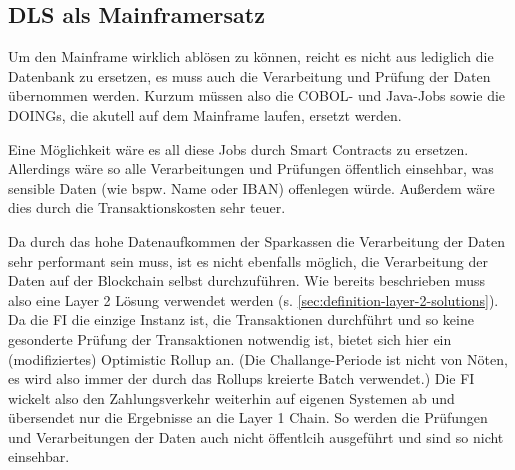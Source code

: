 

\subsection{DLS als Mainframersatz}
Um den Mainframe wirklich ablösen zu können, reicht es nicht aus lediglich die Datenbank zu ersetzen, es muss auch die Verarbeitung und Prüfung der Daten übernommen werden.
Kurzum müssen also die COBOL- und Java-Jobs sowie die DOINGs, die akutell auf dem Mainframe laufen, ersetzt werden.

\noindent
Eine Möglichkeit wäre es all diese Jobs durch Smart Contracts zu ersetzen.
Allerdings wäre so alle Verarbeitungen und Prüfungen öffentlich einsehbar, was sensible Daten (wie bspw. Name oder IBAN) offenlegen würde.
Außerdem wäre dies durch die Transaktionskosten sehr teuer.

\noindent
Da durch das hohe Datenaufkommen der Sparkassen die Verarbeitung der Daten sehr performant sein muss, ist es nicht ebenfalls möglich, die Verarbeitung der Daten auf der Blockchain selbst durchzuführen.
Wie bereits beschrieben muss also eine Layer 2 Lösung verwendet werden (s. \ref{sec:definition-layer-2-solutions}).
Da die FI die einzige Instanz ist, die Transaktionen durchführt und so keine gesonderte Prüfung der Transaktionen notwendig ist, bietet sich hier ein (modifiziertes) Optimistic Rollup an. 
(Die Challange-Periode ist nicht von Nöten, es wird also immer der durch das Rollups kreierte Batch verwendet.)
Die FI wickelt also den Zahlungsverkehr weiterhin auf eigenen Systemen ab und übersendet nur die Ergebnisse an die Layer 1 Chain.
So werden die Prüfungen und Verarbeitungen der Daten auch nicht öffentlcih ausgeführt und sind so nicht einsehbar.

